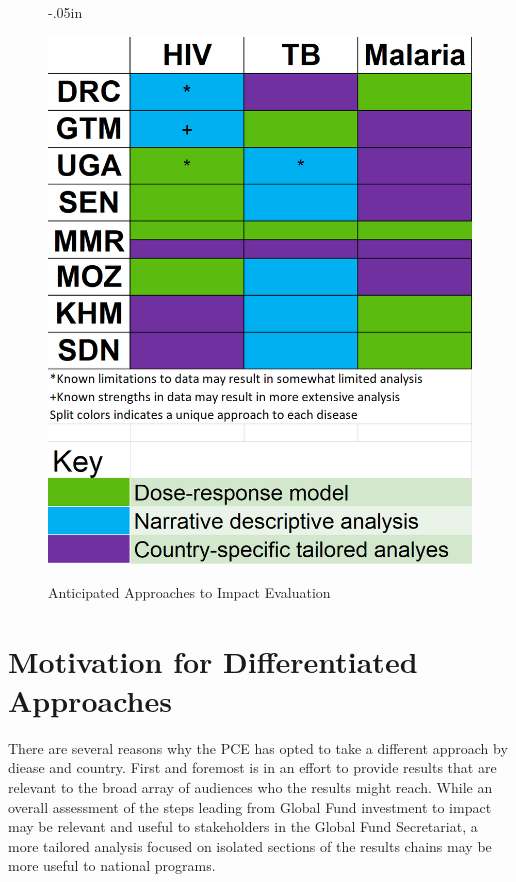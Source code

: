 \documentclass[twocolumn]{bmcart}%
\begin{document}
\begin{figure}[h]
  \advance\leftskip-.05in
  \caption{\textmd{Anticipated Approaches to Impact Evaluation}}
  \includegraphics[scale=.4]{Differentiated_Plans_Image.png} \\
  \label{fig1}
\end{figure}


\section{Motivation for Differentiated Approaches} \label{why}

There are several reasons why the PCE has opted to take a different approach by diease and country. First and foremost is in an effort to provide results that are relevant to the broad array of audiences who the results might reach. While an overall assessment of the steps leading from Global Fund investment to impact may be relevant and useful to stakeholders in the Global Fund Secretariat, a more tailored analysis focused on isolated sections of the results chains may be more useful to national programs. \\
\end{document}
